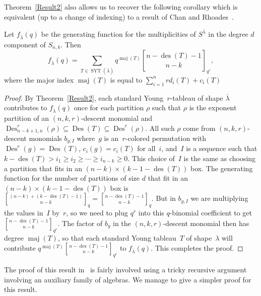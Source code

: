 \documentclass[ALCO,ThmDefs,Unicode,epreuves]{cedram}
\DeclareMathOperator{\Des}{Des}
\DeclareMathOperator{\des}{des}
\DeclareMathOperator{\maj}{maj}
\DeclareMathOperator{\SYT}{SYT}
\begin{document}

Theorem~\ref{Result2} also allows us to recover the following corollary which is equivalent (up to a change of indexing) to a 
result of Chan and Rhoades~\cite{CR}.

\begin{coro}
	Let $f_{\overline{\lambda}}(q)$ be the generating function for the multiplicities of $S^{\overline{\lambda}}$ in the degree 
$d$ component of $S_{n,k}$. Then
\begin{equation}
f_{\overline{\lambda}}(q)=\sum_{T\in \SYT (\overline{\lambda})} 
q^{\maj(T)}\genfrac{[}{]}{0pt}{}{n-\des (T)-1}{n-k}_{q^r},
\end{equation}
	where the major index $\maj(T)$ is equal to $\sum_{i=1}^n rd_i(T)+c_i(T)$
	\begin{proof}

		By Theorem~\ref{Result2}, each standard Young~$r$-tableau of shape $\overline{\lambda}$ contributes to 
$f_{\overline{\lambda}}(q)$ once for each partition $\rho$ such that $\rho$ is the exponent partition of an 
$(n,k,r)$-descent monomial and $\Des ^r_{n-k+1,n}(\rho)\subseteq \Des (T)\subseteq \Des ^r(\rho)$. All such $\rho$ come from 
$(n,k,r)$-descent monomials $b_{g,I}$ where~$g$ is an~$r$-colored permutation with $\Des ^r(g)=\Des (T)$, $c_i(g)=c_i(T)$ 
for all~$i$, and~$I$ is a sequence such that $k-\des (T)>i_1\geq i_2\geq\cdots\geq i_{n-k}\geq 0$. This choice of~$I$ 
is the same as choosing a partition that fits in an $(n-k)\times (k-1-\des (T))$ box. The generating function for the 
number of partitions of size $d$ that fit in an $(n-k)\times (k-1-\des (T))$ box is 
$\genfrac{[}{]}{0pt}{}{(n-k)+(k-\des (T)-1)}{n-k}_q=\genfrac{[}{]}{0pt}{}{n-\des (T)-1}{n-k}_q$. But in $b_{g,I}$ we are 
multiplying the values in~$I$ by~$r$, so we need to plug $q^r$ into this $q$-binomial coefficient to get 
$\genfrac{[}{]}{0pt}{}{n-\des (T)-1}{n-k}_{q^r}$. The factor of $b_g$ in the $(n,k,r)$-descent monomial then has degree 
$\maj(T)$, so that each standard Young tableau~$T$ of shape~$\lambda$ will contribute 
$q^{\maj(T)}\genfrac{[}{]}{0pt}{}{n-\des (T)-1}{n-k}_{q^r}$ to $f_{\overline{\lambda}}(q)$. This completes the proof.
	\end{proof}
\end{coro}

The proof of this result in~\cite{CR} is fairly involved using a tricky recursive argument involving an auxiliary family of 
algebras. We manage to give a simpler proof for this result.
\end{document}
